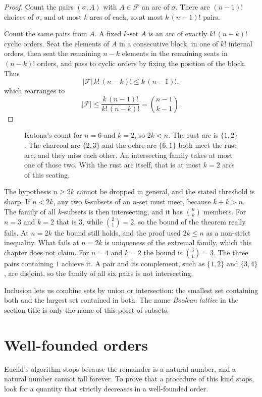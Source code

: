 \begin{proof}
Count the pairs $(\sigma,A)$ with $A\in\mathcal F$ an arc of $\sigma$. There are $(n-1)!$ choices of $\sigma$, and at most $k$ arcs of each, so at most $k\,(n-1)!$ pairs.

Count the same pairs from $A$. A fixed $k$-set $A$ is an arc of exactly $k!\,(n-k)!$ cyclic orders. Seat the elements of $A$ in a consecutive block, in one of $k!$ internal orders, then seat the remaining $n-k$ elements in the remaining seats in $(n-k)!$ orders, and pass to cyclic orders by fixing the position of the block. Thus
\[
|\mathcal F|\,k!\,(n-k)!\le k\,(n-1)!,
\]
which rearranges to
\[
|\mathcal F|\le\frac{k\,(n-1)!}{k!\,(n-k)!}=\binom{n-1}{k-1}.
\]
\end{proof}

\begin{figure}[ht]
\centering
{}
\caption{Katona's count for $n=6$ and $k=2$, so $2k<n$. The rust arc is $\{1,2\}$. The charcoal arc $\{2,3\}$ and the ochre arc $\{6,1\}$ both meet the rust arc, and they miss each other. An intersecting family takes at most one of those two. With the rust arc itself, that is at most $k=2$ arcs of this seating.}
\label{orders:fig:ekr}
\end{figure}

The hypothesis $n\ge 2k$ cannot be dropped in general, and the stated threshold is sharp. If $n<2k$, any two $k$-subsets of an $n$-set must meet, because $k+k>n$. The family of all $k$-subsets is then intersecting, and it has $\binom nk$ members. For $n=3$ and $k=2$ that is $3$, while $\binom{2}{1}=2$, so the bound of the theorem really fails. At $n=2k$ the bound still holds, and the proof used $2k\le n$ as a non-strict inequality. What fails at $n=2k$ is uniqueness of the extremal family, which this chapter does not claim. For $n=4$ and $k=2$ the bound is $\binom31=3$. The three pairs containing $1$ achieve it. A pair and its complement, such as $\{1,2\}$ and $\{3,4\}$, are disjoint, so the family of all six pairs is not intersecting.

Inclusion lets us combine sets by union or intersection: the smallest set containing both and the largest set contained in both. The name \emph{Boolean lattice} in the section title is only the name of this poset of subsets.

\section{Well-founded orders}

Euclid's algorithm stops because the remainder is a natural number, and a natural number cannot fall forever. To prove that a procedure of this kind stops, look for a quantity that strictly decreases in a well-founded order.

